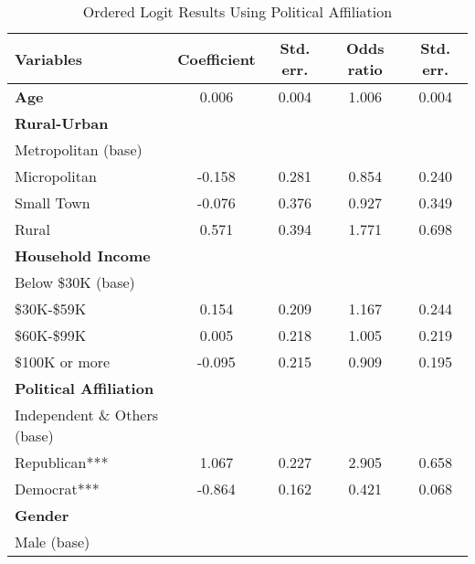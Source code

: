 


\begin{table}[H]
\centering
\caption{Ordered Logit Results Using Political Affiliation}
\begin{tabular}{lcccc}
\toprule
\textbf{Variables} & \textbf{Coefficient} & \textbf{Std. err.} & \textbf{Odds ratio} & \textbf{Std. err.} \\ \midrule
\textbf{Age}                          & 0.006       & 0.004     & 1.006      & 0.004     \\
\textbf{Rural-Urban}                  &             &           &            &           \\
Metropolitan (base)          &             &           &            &           \\
Micropolitan                 & -0.158      & 0.281     & 0.854      & 0.240     \\
Small Town                   & -0.076      & 0.376     & 0.927      & 0.349     \\
Rural                        & 0.571       & 0.394     & 1.771      & 0.698     \\
\textbf{Household Income}             &             &           &            &           \\
Below \$30K (base)           &             &           &            &           \\
\$30K-\$59K                  & 0.154       & 0.209     & 1.167      & 0.244     \\
\$60K-\$99K                  & 0.005       & 0.218     & 1.005      & 0.219     \\
\$100K or more               & -0.095      & 0.215     & 0.909      & 0.195     \\
\textbf{Political Affiliation}        &             &           &            &           \\
Independent \& Others (base) &             &           &            &           \\
Republican***                & 1.067       & 0.227     & 2.905      & 0.658     \\
Democrat***                  & -0.864      & 0.162     & 0.421      & 0.068     \\
\textbf{Gender}                       &             &           &            &           \\
Male (base)                  &             &           &            &           \\

\end{tabular}
\end{table}
